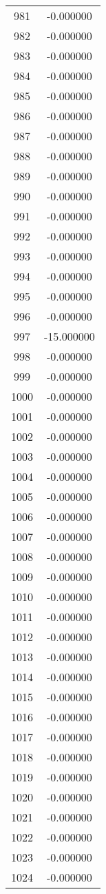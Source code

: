 \documentclass[12pt]{article}
\begin{document}
\begin{longtable}{@{}cc@{}}
981 & -0.000000 \\
982 & -0.000000 \\
983 & -0.000000 \\
984 & -0.000000 \\
985 & -0.000000 \\
986 & -0.000000 \\
987 & -0.000000 \\
988 & -0.000000 \\
989 & -0.000000 \\
990 & -0.000000 \\
991 & -0.000000 \\
992 & -0.000000 \\
993 & -0.000000 \\
994 & -0.000000 \\
995 & -0.000000 \\
996 & -0.000000 \\
997 & -15.000000 \\
998 & -0.000000 \\
999 & -0.000000 \\
1000 & -0.000000 \\
1001 & -0.000000 \\
1002 & -0.000000 \\
1003 & -0.000000 \\
1004 & -0.000000 \\
1005 & -0.000000 \\
1006 & -0.000000 \\
1007 & -0.000000 \\
1008 & -0.000000 \\
1009 & -0.000000 \\
1010 & -0.000000 \\
1011 & -0.000000 \\
1012 & -0.000000 \\
1013 & -0.000000 \\
1014 & -0.000000 \\
1015 & -0.000000 \\
1016 & -0.000000 \\
1017 & -0.000000 \\
1018 & -0.000000 \\
1019 & -0.000000 \\
1020 & -0.000000 \\
1021 & -0.000000 \\
1022 & -0.000000 \\
1023 & -0.000000 \\
1024 & -0.000000 \\

\end{longtable}
\end{document}
